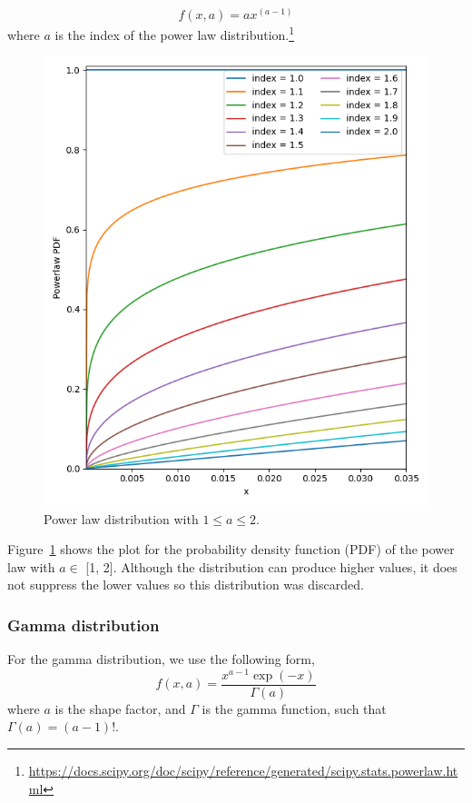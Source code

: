 \begin{equation}
    f(x, a) = ax^{(a-1)}
    \label{eq:powerlaw_distribution}
\end{equation}
where $a$ is the index of the power law distribution.\footnote{\url{https://docs.scipy.org/doc/scipy/reference/generated/scipy.stats.powerlaw.html}}
\begin{figure}[!h]%
    \centering
    \includegraphics[width=\linewidth]{images/powerlaw}
    \caption{Power law distribution with $1 \leq a \leq 2$.}
    \label{fig:pl_distribution}
\end{figure}%

Figure~\ref{fig:pl_distribution} shows the plot for the probability density function (PDF) of the power law with $a \in$ [1, 2].
Although the distribution can produce higher values, it does not suppress the lower values so this distribution was discarded.
\,\\\subsubsection*{\textbf{Gamma distribution}}
For the gamma distribution, we use the following form,
\begin{equation}
    f(x, a) = \frac{x^{a-1}\exp(-x)}{\Gamma(a)}
    \label{eq:gamma_distribution}
\end{equation}
where $a$ is the shape factor, and $\Gamma$ is the gamma function, such that $\Gamma(a) = (a-1)!$.

